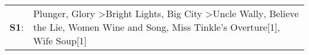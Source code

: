 \begin{supertabular}{p{0.03\textwidth}p{0.92\textwidth}}
 \textbf{S1}:  &  Plunger\textsuperscript{}, \enspace Glory\textsuperscript{} \textgreater \enspace Bright Lights, Big City\textsuperscript{} \textgreater \enspace Uncle Wally\textsuperscript{}, \enspace Believe the Lie\textsuperscript{}, \enspace Women Wine and Song\textsuperscript{}, \enspace Miss Tinkle's Overture[1]\textsuperscript{}, \enspace Wife Soup[1]\textsuperscript{}  \enspace  \\
\end{supertabular}
